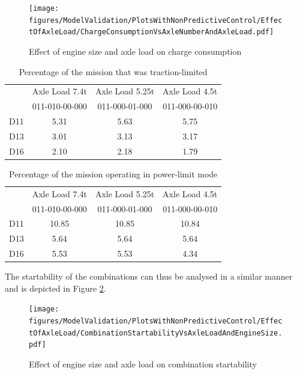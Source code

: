 \documentclass[ExampleMasters.tex]{subfiles}
\begin{document}
	\begin{figure}
	\centering
	\texttt{[image: figures/ModelValidation/PlotsWithNonPredictiveControl/EffectOfAxleLoad/ChargeConsumptionVsAxleNumberAndAxleLoad.pdf]}
	\caption{Effect of engine size and axle load on charge consumption}
	\label{chargeEngineSizeAxleLoad}
	\end{figure}
	\begin{table}
	\centering
	\begin{tabular}{|c|c|c|c|}
	\hline
	& Axle Load 7.4t & Axle Load 5.25t & Axle Load 4.5t \\
	& 011-010-00-000 & 011-000-01-000 & 011-000-00-010 \\
	\hline
	D11 & 5.31 & 5.63 & 5.75 \\
	\hline
	D13 & 3.01 & 3.13 & 3.17 \\
	\hline
	D16 & 2.10 & 2.18 & 1.79 \\
	\hline
	\end{tabular}
	\caption{Percentage of the mission that was traction-limited}
	\label{table:tractionLimitMode}
	\end{table}
	\begin{table}
	\centering
	\begin{tabular}{|c|c|c|c|}
	\hline
	& Axle Load 7.4t & Axle Load 5.25t & Axle Load 4.5t \\
	& 011-010-00-000 & 011-000-01-000 & 011-000-00-010 \\
	\hline
	D11 & 10.85 & 10.85 & 10.84 \\
	\hline
	D13 & 5.64 & 5.64 & 5.64 \\
	\hline
	D16 & 5.53 & 5.53 & 4.34 \\
	\hline
	\end{tabular}
	\caption{Percentage of the mission operating in power-limit mode}
	\label{table:powerLimitMode}
	\end{table}
	The startability of the combinations can thus be analysed in a similar manner and is depicted in Figure \ref{startabilityEngineAxleLoad}.\\
	\begin{figure}
	\centering
	\texttt{[image: figures/ModelValidation/PlotsWithNonPredictiveControl/EffectOfAxleLoad/CombinationStartabilityVsAxleLoadAndEngineSize.pdf]}
	\caption{Effect of engine size and axle load on combination startability}
	\label{startabilityEngineAxleLoad}
	\end{figure}
\end{document}
